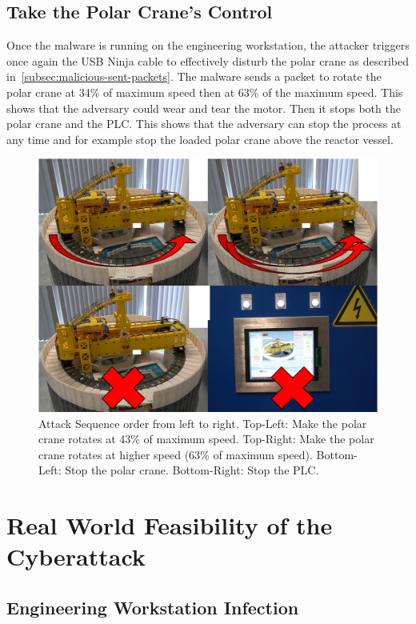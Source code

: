\subsection{Take the Polar Crane's Control}

Once the malware is running on the engineering workstation, the attacker triggers once again the USB Ninja cable to effectively disturb the polar crane as described in~\autoref{subsec:malicious-sent-packets}. The malware sends a packet to rotate the polar crane at 34\% of maximum speed then at 63\% of the maximum speed. This shows that the adversary could wear and tear the motor. Then it stops both the polar crane and the PLC. This shows that the adversary can stop the process at any time and for example stop the loaded polar crane above the reactor vessel. 

\begin{figure}[H]
    \centering
    \includegraphics[width=0.9\linewidth]{figures/step-atk}
    \caption{Attack Sequence order from left to right. Top-Left: Make the polar crane rotates at 43\% of maximum speed. Top-Right: Make the polar crane rotates at higher speed (63\% of maximum speed). Bottom-Left: Stop the polar crane. Bottom-Right: Stop the PLC.}
    \label{fig:atk-steps}
\end{figure}

\section{Real World Feasibility of the Cyberattack}

\subsection{Engineering Workstation Infection}

